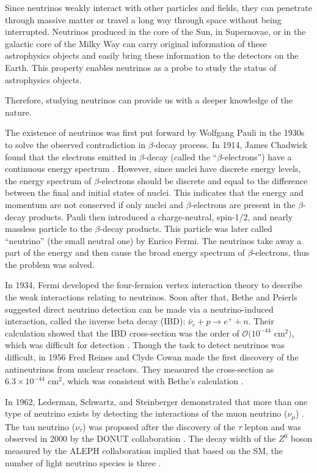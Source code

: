 Since neutrinos weakly interact with other particles and fields, they can penetrate through massive matter or travel a long way through space without being interrupted. Neutrinos produced in the core of the Sun, in Supernovae, or in the galactic core of the Milky Way can carry original information of these astrophysics objects and easily bring these information to the detectors on the Earth. This property enables neutrinos as a probe to study the status of astrophysics objects.

Therefore, studying neutrinos can provide us with a deeper knowledge of the nature.

The existence of neutrinos was first put forward by Wolfgang Pauli in the 1930s to solve the observed contradiction in $\beta$-decay process. In 1914, James Chadwick found that the electrons emitted in $\beta$-decay (called the ``$\beta$-electrons'') have a continuous energy spectrum \cite{leite1996weak}. However, since nuclei have discrete energy levels, the energy spectrum of $\beta$-electrons should be discrete and equal to the difference between the final and initial states of nuclei. This indicates that the energy and momentum are not conserved if only nuclei and $\beta$-electrons are present in the $\beta$-decay products. Pauli then introduced a charge-neutral, spin-1/2, and nearly massless particle to the $\beta$-decay products. This particle was later called ``neutrino'' (the small neutral one) by Enrico Fermi. The neutrinos take away a part of the energy and then cause the broad energy spectrum of $\beta$-electrons, thus the problem was solved.

In 1934, Fermi developed the four-fermion vertex interaction theory to describe the weak interactions relating to neutrinos. Soon after that, Bethe and Peierls suggested direct neutrino detection can be made via a neutrino-induced interaction, called the inverse beta decay (IBD): $\bar{\nu}_e+p\to e^+ + n$. Their calculation showed that the IBD cross-section was the order of $\mathcal{O}(10^{-44}$ cm$^2)$, which was difficult for detection \cite{bethe1934neutrino}. Though the task to detect neutrinos was difficult, in 1956 Fred Reines and Clyde Cowan made the first discovery of the antineutrinos from nuclear reactors. They measured the cross-section as $6.3\times10^{-44}$ cm$^2$, which was consistent with Bethe's calculation \cite{reines1960detection}.

In 1962, Lederman, Schwartz, and Steinberger demonstrated that more than one type of neutrino exists by detecting the interactions of the muon neutrino ($\nu_\mu$) \cite{danby1962observation}. The tau neutrino ($\nu_\tau$) was proposed after the discovery of the $\tau$ lepton and was observed in 2000 by the DONUT collaboration \cite{kodama2001observation}. The decay width of the $Z^0$ boson measured by the ALEPH collaboration implied that based on the SM, the number of light neutrino species is three \cite{decamp1989determination}.

